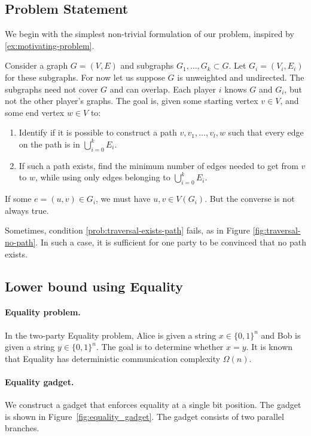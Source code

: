 \subsection{Problem Statement}

We begin with the simplest non-trivial formulation of our problem, inspired by \ref{ex:motivating-problem}.

Consider a graph $G = (V,E)$ and subgraphs $G_1, \ldots, G_k \subset G$. Let $G_i = (V_i, E_i)$ for these subgraphs. For now let us suppose $G$ is unweighted and undirected. The subgraphs need not cover $G$ and can overlap. Each player $i$ knows $G$ and $G_i$, but not the other player's graphs. The goal is, given some starting vertex $v \in V$, and some end vertex $w \in V$ to:
\begin{enumerate}
	\item  Identify if it is possible to construct a path $v, v_1, \dots, v_l, w$ such that every edge on the path is in $\bigcup_{i=0}^{k} E_i$. \label{prob:traversal-exists-path}
	\item  If such a path exists, find the minimum number of edges needed to get from $v$ to $w$, while using only edges belonging to $\bigcup_{i=0}^{k} E_i$. \label{prob:traversal-min-path}
\end{enumerate}
If some $e = (u,v) \in G_i$, we must have $u,v \in V(G_i)$. But the converse is not always true.



Sometimes, condition \ref{prob:traversal-exists-path} fails, as in Figure \ref{fig:traversal-no-path}. In such a case, it is sufficient for one party to be convinced that no path exists.



\subsection{Lower bound using Equality}

\paragraph{Equality problem.}
In the two-party Equality problem, Alice is given a string $x \in \{0,1\}^n$ and Bob is given a string $y \in \{0,1\}^n$. The goal is to determine whether $x = y$. It is known that Equality has deterministic communication complexity $\Omega(n)$.

\paragraph{Equality gadget.}
We construct a gadget that enforces equality at a single bit position. The gadget is shown in Figure~\ref{fig:equality_gadget}. The gadget consists of two parallel branches.

